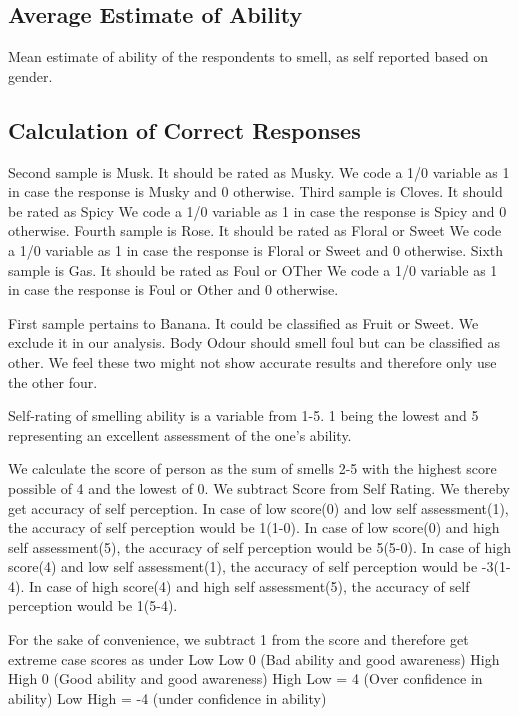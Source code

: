 \documentclass[
]{article}
\begin{document}
\subsection{Average Estimate of Ability}

Mean estimate of ability of the respondents to smell, as self reported based on gender.

\subsection{Calculation of Correct Responses}

Second sample is Musk. It should be rated as Musky. We code a 1/0 variable as 1 in case the response is Musky and 0 otherwise.
Third sample is Cloves. It should be rated as Spicy We code a 1/0 variable as 1 in case the response is Spicy and 0 otherwise.
Fourth sample is Rose. It should be rated as Floral or Sweet We code a 1/0 variable as 1 in case the response is Floral or Sweet and 0 otherwise.
Sixth sample is Gas. It should be rated as Foul or OTher We code a 1/0 variable as 1 in case the response is Foul or Other and 0 otherwise.

First sample pertains to Banana. It could be classified as Fruit or Sweet. We exclude it in our analysis. Body Odour should smell foul but can be classified as other. We feel these two might not show accurate results and therefore only use the other four.

Self-rating of smelling ability is a variable from 1-5. 1 being the lowest and 5 representing an excellent assessment of the one's ability.

We calculate the score of person as the sum of smells 2-5 with the highest score possible of 4 and the lowest of 0.
We subtract Score from Self Rating. We thereby get accuracy of self perception.
In case of low score(0) and low self assessment(1), the accuracy of self perception would be 1(1-0).
In case of low score(0) and high self assessment(5), the accuracy of self perception would be 5(5-0).
In case of high score(4) and low self assessment(1), the accuracy of self perception would be -3(1-4).
In case of high score(4) and high self assessment(5), the accuracy of self perception would be 1(5-4).

For the sake of convenience, we subtract 1 from the score and therefore get extreme case scores as under
Low Low 0 (Bad ability and good awareness)
High High 0 (Good ability and good awareness)
High Low = 4 (Over confidence in ability)
Low High = -4 (under confidence in ability)
\end{document}
